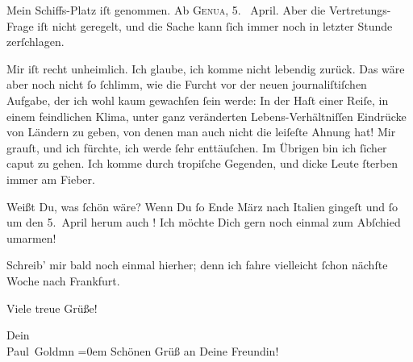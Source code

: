 \pstart
           Mein Schiffs-Platz iſt
               genommen. Ab \textsc{Genua}, 5.  April.
               Aber die Vertretungs-Frage iſt
               nicht geregelt, und die {\pb}Sache kann ſich immer noch
               in letzter Stunde zerſchlagen.\pend
           
\pstart
           Mir iſt recht unheimlich. Ich glaube, ich komme nicht lebendig zurück. Das wäre aber
               noch nicht ſo ſchlimm, wie die Furcht vor der neuen journaliſtiſchen Aufgabe, der ich
                  \strikeout{\textcolor{gray}{w}} wohl kaum gewachſen ſein werde: In der Haſt einer Reiſe, in einem feindlichen
               Klima, unter ganz veränderten Lebens-Verhältniſſen Eindrücke von Ländern zu geben,
                  \strikeout{\textcolor{gray}{×}}{ } von denen man auch nicht die
               leiſeſte Ahnung hat! Mir grauſt, und ich fürchte, ich werde ſehr enttäuſchen. Im
               Übrigen bin ich ſicher caput zu gehen. Ich komme durch tropiſche {\pb}Gegenden, und dicke Leute ſterben immer am
               Fieber.\pend
           
\pstart
           Weißt Du, was ſchön wäre? Wenn Du ſo  Ende März nach Italien gingeſt und ſo um den 5. April herum
               auch \label{K_L02841-2v}\label{K_L02841-2}!
               Ich möchte Dich gern noch einmal zum Abſchied umarmen!\pend
           
\pstart
           Schreib’ mir bald noch einmal hierher; denn ich fahre vielleicht ſchon nächſte Woche
               nach Frankfurt.\pend
           
\pstart
           Viele treue Grüße!\pend
           
\pstart
           Dein {\\[\baselineskip]}\spacefill\mbox{Paul Goldmn}\pend
           \leftskip=0em{}
\pstart
           \noindent{}Schönen Grüß an Deine Freundin!\pend
           \endnumbering{}  
      